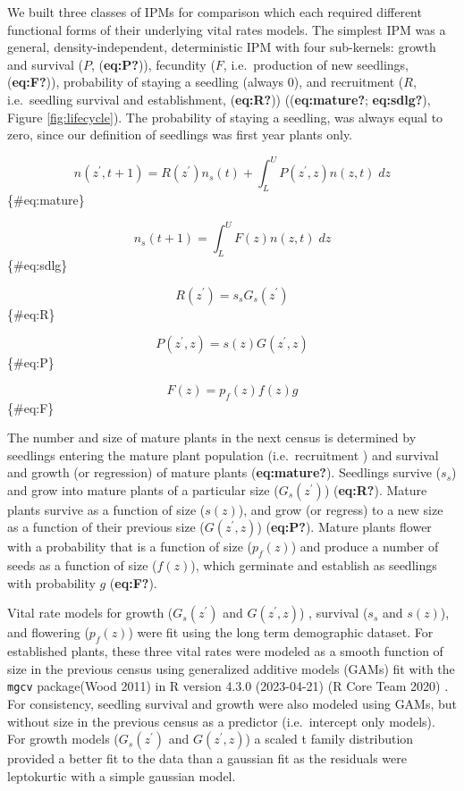 \documentclass[
]{article}
\begin{document}
We built three classes of IPMs for comparison which each required different functional forms of their underlying vital rates models.
The simplest IPM was a general, density-independent, deterministic IPM with four sub-kernels: growth and survival (\(P\), (\textbf{eq:P?})), fecundity (\(F\), i.e.~production of new seedlings, (\textbf{eq:F?})), probability of staying a seedling (always 0), and recruitment (\(R\), i.e.~seedling survival and establishment, (\textbf{eq:R?})) ((\textbf{eq:mature?}; \textbf{eq:sdlg?}), Figure \ref{fig:lifecycle}).
The probability of staying a seedling, was always equal to zero, since our definition of seedlings was first year plants only.

\[
n(z^{\prime},t+1) = R(z^\prime)n_s(t) + \int_L^U P(z^\prime,z) n(z,t)\;dz
\]\{\#eq:mature\}

\[
n_s(t+1) = \int_L^U F(z) n(z,t) \; dz
\]\{\#eq:sdlg\}

\[
R(z^\prime) = s_sG_s(z^\prime)
\]\{\#eq:R\}

\[
P(z^\prime, z) = s(z)G(z^\prime, z)
\]\{\#eq:P\}

\[
F(z) = p_f(z)f(z)g
\]\{\#eq:F\}

The number and size of mature plants in the next census is determined by seedlings entering the mature plant population (i.e.~recruitment ) and survival and growth (or regression) of mature plants (\textbf{eq:mature?}).
Seedlings survive (\(s_s\)) and grow into mature plants of a particular size (\(G_s(z^\prime)\)) (\textbf{eq:R?}).
Mature plants survive as a function of size (\(s(z)\)), and grow (or regress) to a new size as a function of their previous size (\(G(z^\prime, z)\)) (\textbf{eq:P?}).
Mature plants flower with a probability that is a function of size (\(p_f(z)\)) and produce a number of seeds as a function of size (\(f(z)\)), which germinate and establish as seedlings with probability \(g\) (\textbf{eq:F?}).

Vital rate models for growth (\(G_s(z^\prime)\) and \(G(z^\prime, z)\)) , survival (\(s_s\) and \(s(z)\)), and flowering (\(p_f(z)\)) were fit using the long term demographic dataset.
For established plants, these three vital rates were modeled as a smooth function of size in the previous census using generalized additive models (GAMs) fit with the \texttt{mgcv} package(Wood 2011) in R version 4.3.0 (2023-04-21) (R Core Team 2020) .
For consistency, seedling survival and growth were also modeled using GAMs, but without size in the previous census as a predictor (i.e.~intercept only models).
For growth models (\(G_s(z^\prime)\) and \(G(z^\prime, z)\)) a scaled t family distribution provided a better fit to the data than a gaussian fit as the residuals were leptokurtic with a simple gaussian model.
\end{document}
